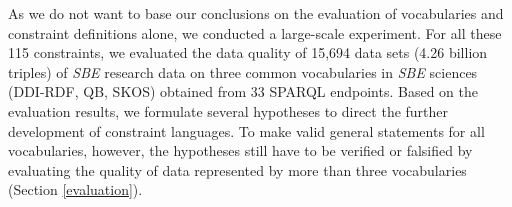\documentclass[conference]{IEEEtran}
\begin{document}
As we do not want to base our conclusions on the evaluation of vocabularies and constraint definitions alone, we conducted a large-scale experiment.
For all these 115 constraints, we evaluated the data quality of 15,694 data sets (4.26 billion triples) of \emph{SBE} research data on three common vocabularies in \emph{SBE} sciences (DDI-RDF, QB, SKOS) obtained from 33 SPARQL endpoints.
Based on the evaluation results,
we formulate several hypotheses to direct the further development of constraint languages.
To make valid general statements for all vocabularies, however,
the hypotheses still have to be verified or falsified
by evaluating the quality of data represented by more than three vocabularies (Section \ref{evaluation}).
\end{document}
